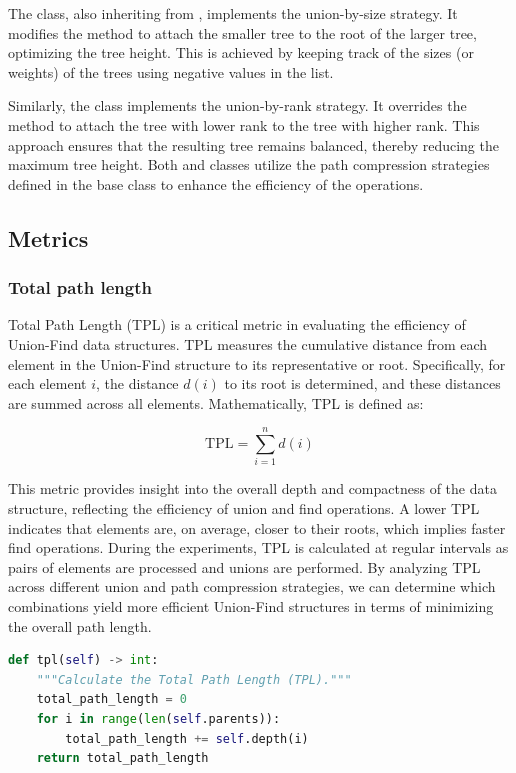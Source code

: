 \documentclass[10pt,a4paper,hidelinks]{article}
\begin{document}
The  class, also inheriting from , implements the union-by-size strategy. It modifies the  method to attach the smaller tree to the root of the larger tree, optimizing the tree height. This is achieved by keeping track of the sizes (or weights) of the trees using negative values in the  list.

Similarly, the  class implements the union-by-rank strategy. It overrides the  method to attach the tree with lower rank to the tree with higher rank. This approach ensures that the resulting tree remains balanced, thereby reducing the maximum tree height. Both  and  classes utilize the path compression strategies defined in the base class to enhance the efficiency of the  operations.

\subsection{Metrics}
\subsubsection{Total path length}
Total Path Length (TPL) is a critical metric in evaluating the efficiency of Union-Find data structures. TPL measures the cumulative distance from each element in the Union-Find structure to its representative or root. Specifically, for each element $i$, the distance $d(i)$ to its root is determined, and these distances are summed across all elements. Mathematically, TPL is defined as:

$$\text{TPL} = \sum_{i=1}^{n} d(i)$$

This metric provides insight into the overall depth and compactness of the data structure, reflecting the efficiency of union and find operations. A lower TPL indicates that elements are, on average, closer to their roots, which implies faster find operations. During the experiments, TPL is calculated at regular intervals as pairs of elements are processed and unions are performed. By analyzing TPL across different union and path compression strategies, we can determine which combinations yield more efficient Union-Find structures in terms of minimizing the overall path length.

\begin{lstlisting}[language=Python, caption=Python implementation of TPL]
def tpl(self) -> int:
    """Calculate the Total Path Length (TPL)."""
    total_path_length = 0
    for i in range(len(self.parents)):
        total_path_length += self.depth(i)
    return total_path_length
\end{lstlisting}
\end{document}
